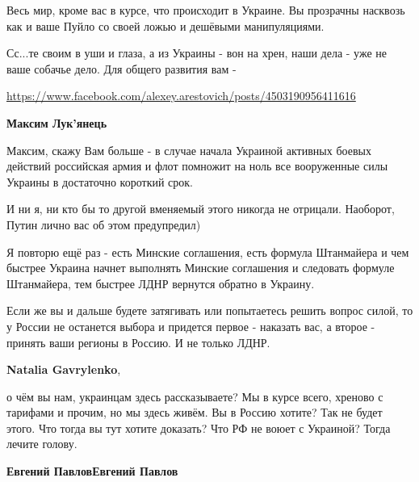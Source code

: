 \begin{itemize}
\begin{itemize}
Весь мир, кроме вас в курсе, что происходит в Украине. Вы прозрачны насквозь
как и ваше Пуйло со своей ложью и дешёвыми манипуляциями. 

Сс...те своим в уши и глаза, а из Украины - вон на хрен, наши дела - уже не
ваше собачье дело. Для общего развития вам - 

\url{https://www.facebook.com/alexey.arestovich/posts/4503190956411616}

 
\textbf{Максим Лук'янець} 

Максим, скажу Вам больше - в случае начала Украиной активных боевых действий
российская армия и флот помножит на ноль все вооруженные силы Украины в
достаточно короткий срок. 

И ни я, ни кто бы то другой вменяемый этого никогда не отрицали. Наоборот,
Путин лично вас об этом предупредил) 

Я повторю ещё раз - есть Минские соглашения, есть формула Штанмайера и чем
быстрее Украина начнет выполнять Минские соглашения и следовать формуле
Штанмайера, тем быстрее ЛДНР вернутся обратно в Украину. 

Если же вы и дальше будете затягивать или попытаетесь решить вопрос силой, то у
России не останется выбора и придется первое - наказать вас, а второе - принять
ваши регионы в Россию. И не только ЛДНР.

 
\textbf{Natalia Gavrylenko}, 

о чём вы нам, украинцам здесь рассказываете? Мы в курсе всего, хреново с
тарифами и прочим, но мы здесь живём. Вы в Россию хотите? Так не будет этого.
Что тогда вы тут хотите доказать? Что РФ не воюет с Украиной? Тогда лечите
голову.


 
\textbf{Евгений Павлов}\textbf{Евгений Павлов} 


\end{itemize}
\end{itemize}
